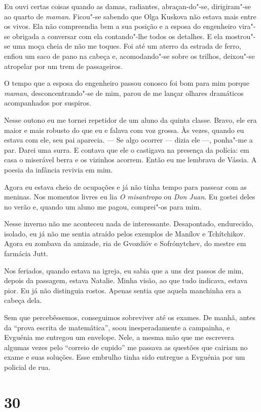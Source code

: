 Eu ouvi certas coisas quando as damas, radiantes, abraçan-do"-se,
dirigiram"-se ao quarto de \emph{maman}. Ficou"-se sabendo que Olga
Kuskova não estava mais entre os vivos. Ela não compreendia bem a sua
posição e a esposa do engenheiro vira"-se obrigada a conversar com ela
contando"-lhe todos os detalhes. E ela mostrou"-se uma moça cheia de não
me toques. Foi até um aterro da estrada de ferro, enfiou um saco de pano
na cabeça e, acomodando"-se sobre os trilhos, deixou"-se atropelar por um
trem de passageiros.

O tempo que a esposa do engenheiro passou conosco foi bom para mim
porque \emph{maman}, desconcentrando"-se de mim, parou de me lançar
olhares dramáticos acompanhados por suspiros.

Nesse outono eu me tornei repetidor de um aluno da quinta classe. Bravo,
ele era maior e mais robusto do que eu e falava com voz grossa. Às
vezes, quando eu estava com ele, seu pai aparecia. --- Se algo ocorrer
--- dizia ele ---, ponha"-me a par. Darei uma surra. E contava que ele o
castigava na presença da polícia: em casa o miserável berra e os
vizinhos acorrem. Então eu me lembrava de Vássia. A poesia da infância
revivia em mim.

Agora eu estava cheio de ocupações e já não tinha tempo para passear com
as meninas. Nos momentos livres eu lia \emph{O misantropo} ou \emph{Don
Juan}. Eu gostei deles no verão e, quando um aluno me pagou, comprei"-os
para mim.

Nesse inverno não me aconteceu nada de interessante. Desapontado,
endurecido, isolado, eu já não me sentia atraído pelos exemplos de
Manílov e Tchítchikov. Agora eu zombava da amizade, ria de Gvozdióv e
Sofrónytchev, do mestre em farmácia Jutt.

Nos feriados, quando estava na igreja, eu sabia que a uns dez passos de
mim, depois da passagem, estava Natalie. Minha visão, ao que tudo
indicava, estava pior. Eu já não distinguia rostos. Apenas sentia que
aquela manchinha era a cabeça dela.

Sem que percebêssemos, conseguimos sobreviver até os exames. De manhã,
antes da ``prova escrita de matemática'', soou inesperadamente a
campainha, e Evguénia me entregou um envelope. Nele, a mesma mão que me
escrevera algumas vezes pelo ``correio de cupido'' me passava as
questões que cairiam no exame e suas soluções. Esse embrulho tinha sido
entregue a Evguénia por um policial de rua.

\section{30}


